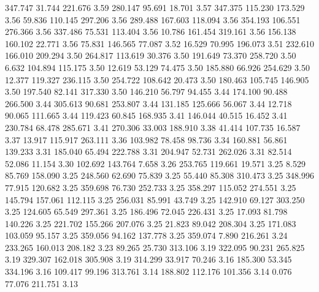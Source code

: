  347.747   31.744  221.676         3.59
 280.147   95.691   18.701         3.57
 347.375  115.230  173.529         3.56
  59.836  110.145  297.206         3.56
 289.488  167.603  118.094         3.56
 354.193  106.551  276.366         3.56
 337.486   75.531  113.404         3.56
  10.786  161.454  319.161         3.56
 156.138  160.102   22.771         3.56
  75.831  146.565   77.087         3.52
  16.529   70.995  196.073         3.51
 232.610  166.010  209.294         3.50
 264.817  113.619   30.376         3.50
 191.649   73.370  258.720         3.50
   6.632  104.894  115.175         3.50
  12.619   53.129   74.475         3.50
 185.880   66.926  254.629         3.50
  12.377  119.327  236.115         3.50
 254.722  108.642   20.473         3.50
 180.463  105.745  146.905         3.50
 197.540   82.141  317.330         3.50
 146.210   56.797   94.455         3.44
 174.100   90.488  266.500         3.44
 305.613   90.681  253.807         3.44
 131.185  125.666   56.067         3.44
  12.718   90.065  111.665         3.44
 119.423   60.845  168.935         3.41
 146.044   40.515   16.452         3.41
 230.784   68.478  285.671         3.41
 270.306   33.003  188.910         3.38
  41.414  107.735   16.587         3.37
  13.917  115.917  263.111         3.36
 103.982   78.458   98.736         3.34
 160.881   56.861  139.233         3.31
 185.040   65.494  222.788         3.31
 204.947   52.731  262.026         3.31
  82.514   52.086   11.154         3.30
 102.692  143.764    7.658         3.26
 253.765  119.661   19.571         3.25
   8.529   85.769  158.090         3.25
 248.560   62.690   75.839         3.25
  55.440   85.308  310.473         3.25
 348.996   77.915  120.682         3.25
 359.698   76.730  252.733         3.25
 358.297  115.052  274.551         3.25
 145.794  157.061  112.115         3.25
 256.031   85.991   43.749         3.25
 142.910   69.127  303.250         3.25
 124.605   65.549  297.361         3.25
 186.496   72.045  226.431         3.25
  17.093   81.798  140.226         3.25
 221.702  155.266  207.076         3.25
  21.823   89.042  208.304         3.25
 171.083  103.059   95.157         3.25
 359.056   94.162  137.778         3.25
 359.074    7.890  216.261         3.24
 233.265  160.013  208.182         3.23
  89.265   25.730  313.106         3.19
 322.095   90.231  265.825         3.19
 329.307  162.018  305.908         3.19
 314.299   33.917   70.246         3.16
 185.300   53.345  334.196         3.16
 109.417   99.196  313.761         3.14
 188.802  112.176  101.356         3.14
   0.076   77.076  211.751         3.13
